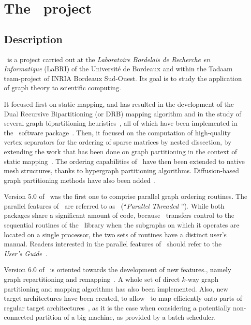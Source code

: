 \section{The \scotch\ project}
\label{sec-project}

\subsection{Description}

\scotch\ is a project carried out at the \textit{Laboratoire Bordelais de
Recherche en Informatique\/} (LaBRI) of the Universit\'e de Bordeaux and
within the Tadaam team-project of INRIA Bordeaux Sud-Ouest. Its goal
is to study the application of graph theory to scientific computing.

It focused first on static mapping, and has resulted in the
development of the Dual Recursive Bipartitioning (or DRB) mapping
algorithm and in the study of several graph bipartitioning
heuristics~\cite{pell94a}, all of which have been implemented in the
\scotch\ software package~\cite{pero96a}. Then, it focused on the
computation of high-quality vertex separators for the ordering of
sparse matrices by nested dissection, by extending the work that has
been done on graph partitioning in the context of static
mapping~\cite{pero97a,peroam99}. The ordering
capabilities of \scotch\ have then been extended to native mesh structures,
thanks to hypergraph partitioning algorithms. Diffusion-based graph
partitioning methods have also been added~\cite{chpe06a,pell07b}.

Version \textsc{5.0} of \scotch\ was the first one to comprise parallel
graph ordering routines. The parallel features of \scotch\ are referred
to as \ptscotch\ (``\emph{Parallel Threaded \scotch}''). While both
packages share a significant amount of code, because
\ptscotch\ transfers control to the sequential routines of the
\libscotch\ library when the subgraphs on which it operates are
located on a single processor, the two sets of routines have a
distinct user's manual. Readers interested in the parallel features
of \scotch\ should refer to the \emph{\ptscotch\ \textsc{\scotchver}
User's Guide}~\scotchcitepuser.

Version \textsc{6.0} of \scotch\ is oriented towards the development of
new features., namely graph repartitioning and
remapping~\cite{fope11a}. A whole set of direct $k$-way graph
partitioning and mapping algorithms has also been implemented.
Also, new target architectures have been created, to allow \scotch\ to
map efficiently onto parts of regular target
architectures~\cite{pellegrini:hal-01671156}, as it is the case when
considering a potentially non-connected partition of a big machine, as
provided by a batch scheduler.

